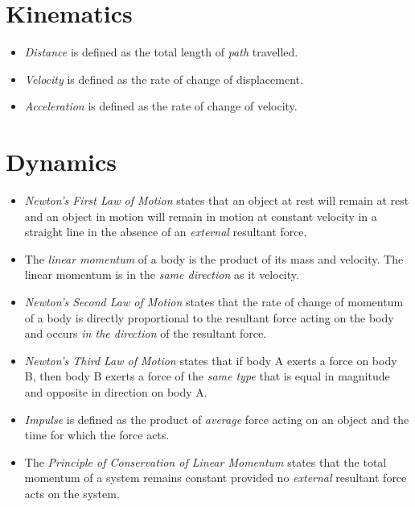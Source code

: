 \documentclass[oneside]{book}
\begin{document}


\raggedright
\setcounter{chapter}{1}
\chapter{Kinematics}
\begin{itemize}
    \item \textit{Distance} is defined as the total length of \emph{path} travelled.
    \item \textit{Velocity} is defined as the rate of change of displacement.
    \item \textit{Acceleration} is defined as the rate of change of velocity.
\end{itemize}
\chapter{Dynamics}
\begin{itemize}
    \item \textit{Newton's First Law of Motion} states that an object at rest will remain at rest and an object in motion will remain in motion at constant velocity in a straight line in the absence of an \emph{external} resultant force.
    \item The \textit{linear momentum} of a body is the product of its mass and velocity. The linear momentum is in the \emph{same direction} as it velocity.
    \item \textit{Newton's Second Law of Motion} states that the rate of change of momentum of a body is directly proportional to the resultant force acting on the body and occurs \emph{in the direction} of the resultant force.
    \item \textit{Newton's Third Law of Motion} states that if body A exerts a force on body B, then body B exerts a force of the \emph{same type} that is equal in magnitude and opposite in direction on body A.
    \item \textit{Impulse} is defined as the product of \emph{average} force acting on an object and the time for which the force acts.
    \item The \textit{Principle of Conservation of Linear Momentum} states that the total momentum of a system remains constant provided no \emph{external} resultant force acts on the system.
\end{itemize}
\end{document}
